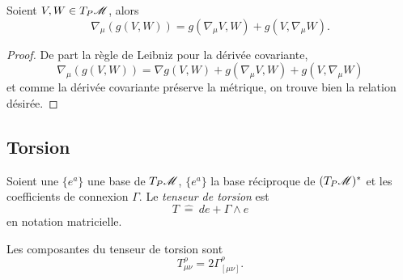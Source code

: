 \documentclass[a4paper,11pt]{report}
\begin{document}
                \begin{prop}\begin{leftbar}
                    Soient $V,W\in T_P\mathscr{M}$, alors
                    \begin{equation}
                        \nabla_\mu(g(V,W)) = g(\nabla_\mu V,W) + g(V,\nabla_\mu W).
                    \end{equation}
                \end{leftbar}\end{prop}
                
                \begin{proof}
                    De part la règle de Leibniz pour la dérivée covariante,
                    \begin{equation}
                         \nabla_\mu(g(V,W)) = \nabla g(V,W) + g(\nabla_\mu V,W) + g(V,\nabla_\mu W)
                    \end{equation}
                    et comme la dérivée covariante préserve la métrique, on trouve bien la relation désirée.
                \end{proof}
            
            \subsection{Torsion}
            
                \begin{definition}
                    Soient une $\{e^a\}$ une base de $T_P\mathscr{M}$, $\{e^a\}$ la base réciproque de $(T_P\mathscr{M})^*$ et les coefficients de connexion $\Gamma$. Le \textit{tenseur de torsion} est
                    \begin{equation}
                        T ~\hat{=}~ de+\Gamma\wedge e
                    \end{equation}
                    en notation matricielle.
                \end{definition}
                
                \begin{prop}\begin{leftbar}
                    Les composantes du tenseur de torsion sont
                    \begin{equation}
                        T^\rho_{\mu\nu} = 2\Gamma^\rho_{[\mu\nu]}.
                    \end{equation}
                \end{leftbar}\end{prop}
                
\end{document}
